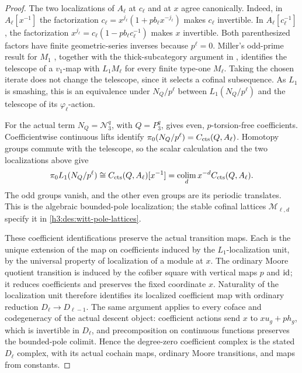 \begin{proof}
The two localizations of \(A_\ell\) at \(c_\ell\) and at \(x\)
agree canonically.  Indeed, in \(A_\ell[x^{-1}]\) the factorization
\(c_\ell=x^{j_\ell}(1+p b_\ell x^{-j_\ell})\) makes \(c_\ell\)
invertible.  In \(A_\ell[c_\ell^{-1}]\), the factorization
\(x^{j_\ell}=c_\ell(1-p b_\ell c_\ell^{-1})\) makes \(x\)
invertible.  Both parenthesized factors have finite geometric-series
inverses because \(p^\ell=0\).
Miller's odd-prime result for \(M_1\)
\cite[Theorem~4.11 and Corollary~4.12]{Miller1981}, together with
the thick-subcategory argument in
\cite[Section~7.5, after Conjecture~7.5.5, p.~85]{RavenelNilpotence},
identifies the telescope of a \(v_1\)-map with \(L_1M_\ell\)
for every finite type-one \(M_\ell\).  Taking the chosen iterate
does not change the telescope, since it selects a cofinal subsequence.
As \(L_1\) is smashing, this is an equivalence under \(N_Q/p^\ell\)
between \(L_1(N_Q/p^\ell)\) and the telescope of its
\(\varphi_\ell\)-action.

For the actual term \(N_Q=\mathcal N_3^q\), with \(Q=P_3^q\),
 gives even, \(p\)-torsion-free
coefficients.  Coefficientwise continuous lifts identify
\(\pi_0(N_Q/p^\ell)=C_{\mathrm{cts}}(Q,A_\ell)\).
Homotopy groups commute with the telescope, so the scalar calculation
and the two localizations above give
\[
 \pi_0L_1(N_Q/p^\ell)
   \cong C_{\mathrm{cts}}(Q,A_\ell)[x^{-1}]
   =\operatorname*{colim}_d x^{-d}C_{\mathrm{cts}}(Q,A_\ell).
\]
The odd groups vanish, and the other even groups are its periodic
translates.  This is the algebraic bounded-pole localization;
the stable cofinal lattices \(\mathcal M_{\ell,d}\) specify it in
\eqref{h3:des:witt-pole-lattices}.

These coefficient identifications preserve the actual transition
maps.  Each is the unique extension of the map on coefficients
induced by the \(L_1\)-localization unit, by the universal property
of localization of a module at \(x\).  The ordinary Moore quotient
transition is induced by the cofiber square with vertical maps \(p\)
and \(\mathrm{id}\); it reduces coefficients and preserves the fixed
coordinate \(x\).  Naturality of the localization unit therefore
identifies its localized coefficient map with ordinary reduction
\(D_\ell\to D_{\ell-1}\).  The same argument applies to every
coface and codegeneracy of the actual descent object: coefficient
actions send \(x\) to \(xu_g+ph_g\), which is invertible in
\(D_\ell\), and precomposition on continuous functions preserves
the bounded-pole colimit.  Hence the degree-zero coefficient
complex is the stated \(D_\ell\) complex, with its actual cochain
maps, ordinary Moore transitions, and maps from constants.


\end{proof}
